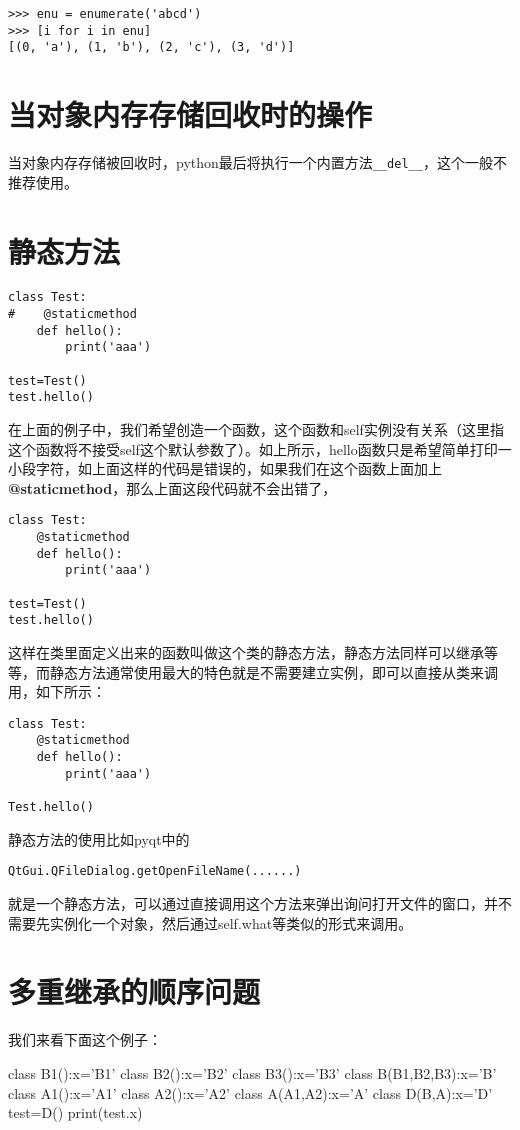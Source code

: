 \documentclass[12pt,oneside]{book}
\begin{document}
\begin{common-format}
\begin{Verbatim}
>>> enu = enumerate('abcd')
>>> [i for i in enu]
[(0, 'a'), (1, 'b'), (2, 'c'), (3, 'd')]
\end{Verbatim}

\section{当对象内存存储回收时的操作}
当对象内存存储被回收时，python最后将执行一个内置方法\verb+__del__+，这个一般不推荐使用。

\section{静态方法}
\begin{Verbatim}
class Test:
#    @staticmethod
    def hello():
        print('aaa')

test=Test()
test.hello()
\end{Verbatim}
在上面的例子中，我们希望创造一个函数，这个函数和self实例没有关系（这里指这个函数将不接受self这个默认参数了）。如上所示，hello函数只是希望简单打印一小段字符，如上面这样的代码是错误的，如果我们在这个函数上面加上\textbf{@staticmethod}，那么上面这段代码就不会出错了，

\begin{Verbatim}
class Test:
    @staticmethod
    def hello():
        print('aaa')

test=Test()
test.hello()
\end{Verbatim}
这样在类里面定义出来的函数叫做这个类的静态方法，静态方法同样可以继承等等，而静态方法通常使用最大的特色就是不需要建立实例，即可以直接从类来调用，如下所示：
\begin{Verbatim}
class Test:
    @staticmethod
    def hello():
        print('aaa')

Test.hello()
\end{Verbatim}

静态方法的使用比如pyqt中的
\begin{Verbatim}
QtGui.QFileDialog.getOpenFileName(......)
\end{Verbatim}
就是一个静态方法，可以通过直接调用这个方法来弹出询问打开文件的窗口，并不需要先实例化一个对象，然后通过self.what等类似的形式来调用。



\section{多重继承的顺序问题}
我们来看下面这个例子：
\begin{tcbpython}[]
class B1():x='B1'
class B2():x='B2'
class B3():x='B3'
class B(B1,B2,B3):x='B'
class A1():x='A1'
class A2():x='A2'
class A(A1,A2):x='A'
class D(B,A):x='D'
test=D()
print(test.x)
\end{tcbpython}


\end{common-format}
\end{document}
